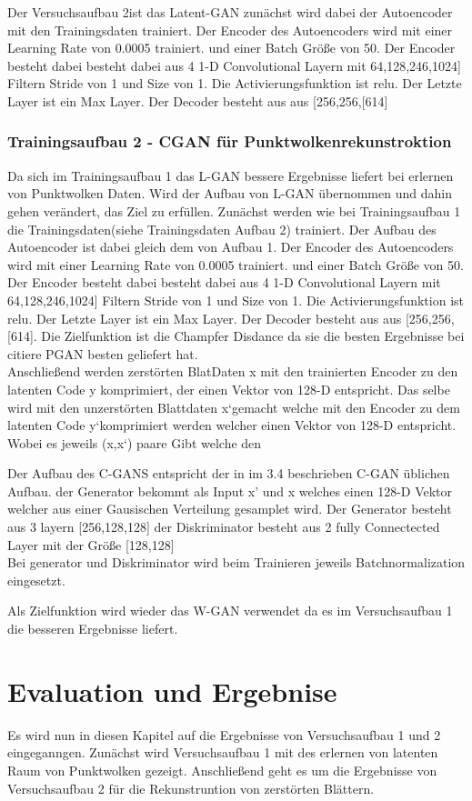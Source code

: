 \documentclass{llncs}
\begin{document}
Der Versuchsaufbau 2ist das Latent-GAN zunächst wird dabei der Autoencoder mit den Trainingsdaten trainiert. Der Encoder des Autoencoders wird mit einer Learning Rate von 0.0005 trainiert. und einer Batch Größe von 50. Der Encoder besteht dabei besteht dabei aus 4 1-D Convolutional Layern mit 64,128,246,1024] Filtern Stride von 1 und Size von 1. Die Activierungsfunktion ist relu. Der Letzte Layer ist ein Max Layer. Der Decoder besteht aus aus [256,256,[614]


\subsubsection{Trainingsaufbau 2 - CGAN für Punktwolkenrekunstroktion }

Da sich im Trainingsaufbau 1 das L-GAN bessere Ergebnisse liefert bei erlernen von Punktwolken Daten. Wird der Aufbau von L-GAN übernommen und dahin gehen verändert, das Ziel zu erfüllen. Zunächst werden wie bei Trainingsaufbau 1 die Trainingsdaten(siehe Trainingsdaten Aufbau 2) trainiert. Der Aufbau des Autoencoder ist dabei gleich dem von Aufbau 1. Der Encoder des Autoencoders wird mit einer Learning Rate von 0.0005 trainiert. und einer Batch Größe von 50. Der Encoder besteht dabei besteht dabei aus 4 1-D Convolutional Layern mit 64,128,246,1024] Filtern Stride von 1 und Size von 1. Die Activierungsfunktion ist relu. Der Letzte Layer ist ein Max Layer. Der Decoder besteht aus aus [256,256,[614]. Die Zielfunktion ist die Champfer Disdance  da sie die besten Ergebnisse bei citiere PGAN besten geliefert hat.\\

Anschließend werden zerstörten BlatDaten x mit den trainierten Encoder zu den latenten Code y komprimiert, der einen Vektor von 128-D entspricht.
Das selbe wird mit den unzerstörten Blattdaten x`gemacht welche mit den Encoder zu dem latenten Code y`komprimiert werden welcher einen Vektor von 128-D entspricht. Wobei es jeweils (x,x`) paare Gibt welche den 

Der Aufbau des C-GANS entspricht der in im 3.4 beschrieben C-GAN üblichen Aufbau. der Generator bekommt als Input x' und x welches einen 128-D Vektor welcher aus einer Gausischen Verteilung gesamplet wird. Der Generator besteht aus 3 layern [256,128,128] der Diskriminator besteht aus 2 fully Connectected Layer mit der Größe [128,128]\\ Bei generator und Diskriminator wird beim Trainieren jeweils Batchnormalization eingesetzt. 

Als Zielfunktion wird wieder das W-GAN verwendet da es im Versuchsaufbau 1 die besseren Ergebnisse liefert. \section{Evaluation und Ergebnise}
Es wird nun in diesen Kapitel auf die Ergebnisse von Versuchsaufbau 1 und 2 eingeganngen. Zunächst wird Versuchsaufbau 1 mit des erlernen von latenten Raum von Punktwolken gezeigt. Anschließend geht es um die Ergebnisse von Versuchsaufbau 2 für die Rekunstruntion von zerstörten Blättern. 
\end{document}
